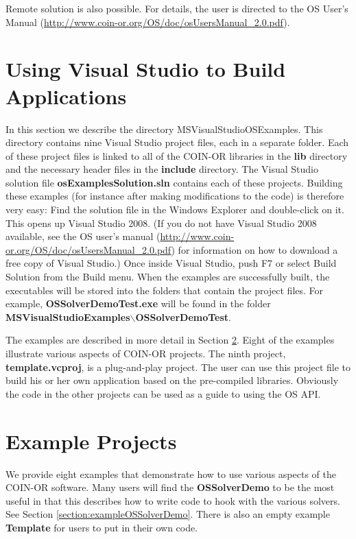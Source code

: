 \documentclass[11pt]{article}
\renewcommand{\_}{{\char"5F}}
\renewcommand{\{}{{\char"7B}}
\renewcommand{\}}{{\char"7D}}
\renewcommand{\^}{{\char"0D}}
\renewcommand{\'}{{\char"0D}}
\begin{document}
Remote solution is also possible. For details, the user is directed to the OS User's Manual
(\url{http://www.coin-or.org/OS/doc/osUsersManual_2.0.pdf}).


\section{Using Visual Studio to Build Applications}\label{section:visualstudio} 
In this section we describe the directory MSVisualStudioOSExamples. 
This directory contains nine Visual Studio project files, each in a separate folder.  
Each of these project files is linked to all of the COIN-OR libraries in the {\bf lib} directory
and the necessary header files in the {\bf include} directory. The Visual Studio solution file 
{\bf osExamplesSolution.sln} contains each of these projects. Building these examples (for instance
after making modifications to the code) is therefore very easy: Find the solution file in the
Windows Explorer and double-click on it. This opens up Visual Studio 2008. 
(If you do not have Visual Studio 2008 available, see the OS user's manual 
(\url{http://www.coin-or.org/OS/doc/osUsersManual_2.0.pdf})
for information on how to download a free copy of Visual Studio.) 
Once inside Visual Studio, push F7 or select Build Solution from the Build menu.
When the examples are successfully built, the executables will be stored into the folders that
contain the project files. For example, {\bf OSSolverDemoTest.exe} will be found in the folder {\bf MSVisualStudioExamples$\backslash$OSSolverDemoTest}.
 
The examples are described in more detail in Section \ref{section:examples}. Eight of the examples 
illustrate various aspects of COIN-OR projects.   The ninth project,  {\bf  template.vcproj}, 
is  a plug-and-play project. The user can use this project file to build his or her own 
application based on the pre-compiled libraries.  Obviously the code in the other projects can be used
as a guide to using the OS API.

\section{Example Projects}\label{section:examples}

We provide eight examples that demonstrate how to use various aspects of the COIN-OR  software.  
Many users will find the {\bf OSSolverDemo} to be the most useful in that this describes 
how to write code to hook with the various solvers.  See Section \ref{section:exampleOSSolverDemo}.  
There is also an empty example {\bf Template} for users to put in their own code. 
\end{document}
